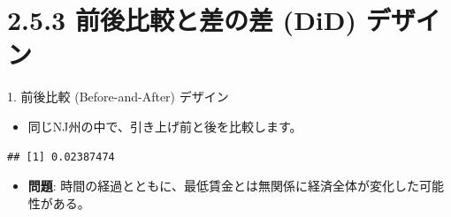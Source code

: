 \documentclass[
  ignorenonframetext,
]{beamer}
\newenvironment{Shaded}{\begin{snugshade}}{\end{snugshade}}
\newcommand{\CommentTok}[1]{\textcolor[rgb]{0.56,0.35,0.01}{\textit{#1}}}
\newcommand{\FunctionTok}[1]{\textcolor[rgb]{0.00,0.00,0.00}{#1}}
\newcommand{\NormalTok}[1]{#1}
\newcommand{\OtherTok}[1]{\textcolor[rgb]{0.56,0.35,0.01}{#1}}
\newcommand{\SpecialCharTok}[1]{\textcolor[rgb]{0.00,0.00,0.00}{#1}}
\providecommand{\tightlist}{%
  \setlength{\itemsep}{0pt}\setlength{\parskip}{0pt}}
\begin{document}
\hypertarget{ux524dux5f8cux6bd4ux8f03ux3068ux5deeux306eux5dee-did-ux30c7ux30b6ux30a4ux30f3}{%
\section{2.5.3 前後比較と差の差 (DiD)
デザイン}\label{ux524dux5f8cux6bd4ux8f03ux3068ux5deeux306eux5dee-did-ux30c7ux30b6ux30a4ux30f3}}

\begin{frame}[fragile]{1. 前後比較 (Before-and-After) デザイン}
\protect\hypertarget{ux524dux5f8cux6bd4ux8f03-before-and-after-ux30c7ux30b6ux30a4ux30f3}{}
\begin{itemize}
\tightlist
\item
  同じNJ州の中で、引き上げ前と後を比較します。
\end{itemize}

\scriptsize

\begin{Shaded}
\end{Shaded}

\begin{verbatim}
## [1] 0.02387474
\end{verbatim}

\normalsize

\begin{itemize}
\tightlist
\item
  \textbf{問題}:
  時間の経過とともに、最低賃金とは無関係に経済全体が変化した可能性がある。
\end{itemize}
\end{frame}
\end{document}
